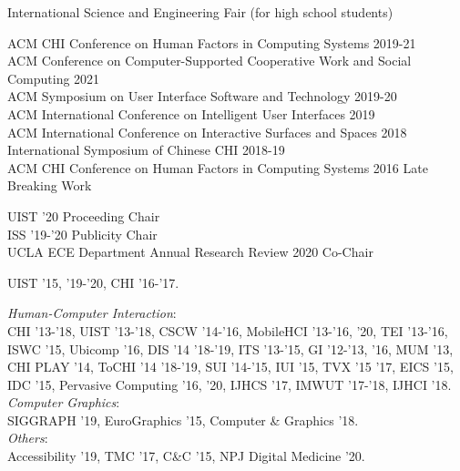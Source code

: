 

 {
	 {
			International Science and Engineering Fair (for high school students)
		}
}

 {
}

 {
	 {
		ACM CHI Conference on Human Factors in Computing Systems 2019-21\\
		ACM Conference on Computer-Supported Cooperative Work and Social Computing 2021\\
		ACM Symposium on User Interface Software and Technology 2019-20\\
		ACM International Conference on Intelligent User Interfaces 2019\\
		ACM International Conference on Interactive Surfaces and Spaces 2018\\
		International Symposium of Chinese CHI 2018-19\\
		ACM CHI Conference on Human Factors in Computing Systems 2016 Late Breaking Work
	}
}

 {
	 {
		UIST '20 Proceeding Chair\\
		ISS '19-'20 Publicity Chair\\
		UCLA ECE Department Annual Research Review 2020 Co-Chair
	}
}

 {
	 {
		UIST '15, '19-'20, CHI '16-'17.
	}
}

 {
	 {
	\textit{Human-Computer Interaction}:\\
		CHI '13-'18, UIST '13-'18, CSCW '14-'16, MobileHCI '13-'16, '20, TEI '13-'16, ISWC '15, Ubicomp '16, DIS '14 '18-'19, ITS '13-'15, GI '12-'13, '16, MUM '13, CHI PLAY '14, ToCHI '14 '18-'19, SUI '14-'15, IUI '15, TVX '15 '17, EICS '15, IDC '15, Pervasive Computing '16, '20, IJHCS '17, IMWUT '17-'18, IJHCI '18. \vspace{0.5em}\\
		\textit{Computer Graphics}:\\
		SIGGRAPH '19,  EuroGraphics '15, Computer \& Graphics '18. \vspace{0.5em}\\
		\textit{Others}:\\
		Accessibility '19, TMC '17, C\&C '15, NPJ Digital Medicine '20.
	}
}

